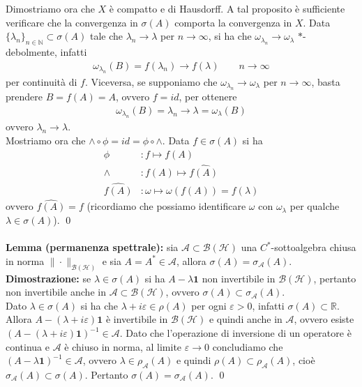 \documentclass{article}
\numberwithin{equation}{subsection}
\begin{document}
Dimostriamo ora che $X$ è compatto e di Hausdorff. A tal proposito è sufficiente verificare che la convergenza in $\sigma(A)$ comporta la convergenza in $X$. Data $\{\lambda_n\}_{n \in \mathbb{N}} \subset \sigma(A)$ tale che $\lambda_n \rightarrow \lambda$ per $n \rightarrow \infty$, si ha che $\omega_{\lambda_n} \rightarrow \omega_\lambda$ $*$-debolmente, infatti
\begin{align*}
    \omega_{\lambda_n}(B) = f(\lambda_n) \rightarrow f(\lambda) \qquad n \rightarrow \infty
\end{align*}
per continuità di $f$. Viceversa, se supponiamo che $\omega_{\lambda_n} \rightarrow \omega_\lambda$ per $n \rightarrow \infty$, basta prendere $B = f(A) = A$, ovvero $f = id$, per ottenere
\begin{align*}
    \omega_{\lambda_n}(B) = \lambda_n \rightarrow \lambda = \omega_\lambda(B)
\end{align*}
ovvero $\lambda_n \rightarrow \lambda$. \\
Mostriamo ora che $\wedge \circ \phi = id = \phi \circ \wedge$. Data $f \in \sigma(A)$ si ha
\begin{align*}
    \phi &: f \mapsto f(A) \\
    \wedge &: f(A) \mapsto \widehat{f(A)} \\
    \widehat{f(A)} &: \omega \mapsto \omega(f(A)) = f(\lambda)
\end{align*}
ovvero $\widehat{f(A)} = f$ (ricordiamo che possiamo identificare $\omega$ con $\omega_\lambda$ per qualche $\lambda \in \sigma(A)$). \qed \\ \\
\textbf{Lemma (permanenza spettrale):} sia $\mathscr{A} \subset \mathcal{B}(\mathcal{H})$ una $C^*$-sottoalgebra chiusa in norma $\|\cdot\|_{\mathcal{B}(\mathcal{H})}$ e sia $A = A^* \in \mathscr{A}$, allora $\sigma(A) = \sigma_\mathscr{A}(A)$. \\

\textbf{Dimostrazione:} se $\lambda \in \sigma(A)$ si ha $A - \lambda\mathbf{1}$ non invertibile in $\mathcal{B}(\mathcal{H})$, pertanto non invertibile anche in $\mathscr{A} \subset \mathcal{B}(\mathcal{H})$, ovvero $\sigma(A) \subset \sigma_\mathscr{A}(A)$. \\
Dato $\lambda \in \sigma(A)$ si ha che $\lambda + i\varepsilon \in \rho(A)$ per ogni $\varepsilon > 0$, infatti $\sigma(A) \subset \mathbb{R}$. Allora $A - (\lambda + i\varepsilon)\mathbf{1}$ è invertibile in $\mathcal{B}(\mathcal{H})$ e quindi anche in $\mathscr{A}$, ovvero esiste $(A - (\lambda + i\varepsilon)\mathbf{1})^{-1} \in \mathscr{A}$. Dato che l'operazione di inversione di un operatore è continua e $\mathscr{A}$ è chiuso in norma, al limite $\varepsilon \rightarrow 0$ concludiamo che $(A - \lambda\mathbf{1})^{-1} \in \mathscr{A}$, ovvero $\lambda \in \rho_\mathscr{A}(A)$ e quindi $\rho(A) \subset \rho_\mathscr{A}(A)$, cioè $\sigma_\mathscr{A}(A) \subset \sigma(A)$. Pertanto $\sigma(A) = \sigma_\mathscr{A}(A)$. \qed
\end{document}
